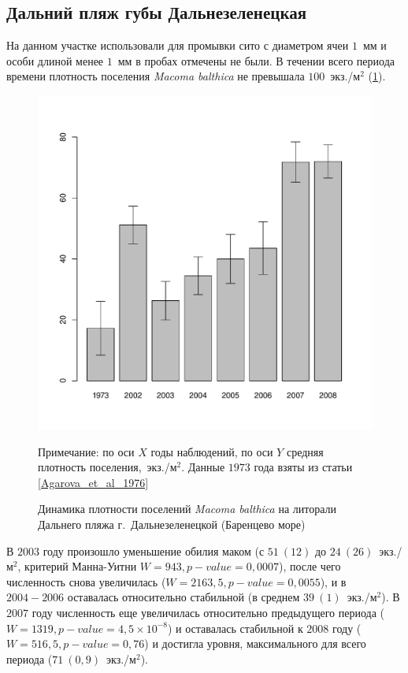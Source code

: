 \documentclass[12pt, a4paper]{disser}
\begin{document}
		\subsection{Дальний пляж губы Дальнезеленецкая}
На данном участке использовали для промывки сито с диаметром ячеи $1$~мм и особи длиной менее $1$~мм в пробах отмечены не были. 
В течении всего периода времени плотность поселения {\it Macoma balthica} не превышала $100$~экз./м$^2$ (\ref{ris:dynamic_Zelency}). 
	\begin{figure}[h]
		\includegraphics{../Barenc_Sea/Dalnezeleneckaya/N_dynamic_with_Agarova.pdf}
	\caption{Динамика плотности поселений {\it Macoma balthica} на литорали Дальнего пляжа г.~Дальнезеленецкой (Баренцево море)}
{\footnotesize Примечание: по оси $X$ \textemdash годы наблюдений, по оси $Y$ \textemdash средняя плотность поселения,~экз./м$^2$. Данные $1973$ года взяты из статьи \ref{Agarova_et_al_1976}}
	\label{ris:dynamic_Zelency}
	\end{figure}
В $2003$ году произошло уменьшение обилия маком (с $51~(12)$ до $24~(26)$~экз./м$^2$, критерий Манна-Уитни  $W = 943, p-value = 0,0007$), после чего численность снова увеличилась ($W = 2163,5, p-value = 0,0055$), и в $2004 - 2006$ оставалась относительно стабильной (в среднем $39~(1)$~экз./м$^2$). 
В $2007$ году численность еще увеличилась относительно предыдущего периода ($W = 1319, p-value = 4,5 \times 10^{-8}$) и оставалась стабильной к $2008$ году ($W = 516,5, p-value = 0,76$) и достигла уровня, максимального для всего периода ($71~(0,9)$~экз./м$^2$).
\end{document}
